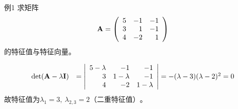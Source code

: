 \begin{frame}
  \begin{footnotesize}
    \begin{exampleblock}{例1}
      求矩阵
      $$
      \mathbf{A}=\left(
      \begin{array}{rrr}
        5&-1&-1\\
        3&1&-1\\
        4&-2&1
      \end{array}
      \right)
      $$
      的特征值与特征向量。
    \end{exampleblock}
    \pause\jiename
    $$
    \begin{array}{rl}
      \det(\mathbf{A}-\lambda\mathbf{I})&=\left|\begin{array}{rrr}
      5-\lambda&-1&-1\\
        3&1-\lambda&-1\\
        4&-2&1-\lambda
      \end{array}\right| =-(\lambda-3)(\lambda-2)^2=0
    \end{array}
    $$
    故特征值为$\lambda_1=3,~\lambda_{2,3}=2\mbox{（二重特征值）}$。
  \end{footnotesize}
\end{frame}

